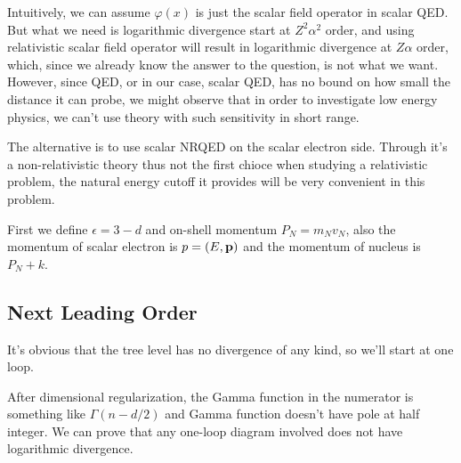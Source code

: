 \documentclass[aps,prd,preprint,showkeys,10pt]{revtex4-1}
\newcommand{\vbp}{\vb{p}}
\renewcommand{\a}{\alpha}
\begin{document}
Intuitively, we can assume $\varphi(x)$ is just the scalar field operator in scalar QED. But what we need is logarithmic divergence start at $Z^2\a^2$ order, and using relativistic scalar field operator will result in logarithmic divergence at $Z\a$ order, which, since we already know the answer to the question, is not what we want. However, since QED, or in our case, scalar QED, has no bound on how small the distance it can probe, we might observe that in order to investigate low energy physics, we can't use theory with such sensitivity in short range.

The alternative is to use scalar NRQED on the scalar electron side. Through it's a non-relativistic theory thus not the first chioce when studying a relativistic problem, the natural energy cutoff it provides will be very convenient in this problem.

First we define $\epsilon=3-d$ and on-shell momentum $P_N=m_Nv_N$, also the momentum of scalar electron is $p=(E,\vbp)$ and the momentum of nucleus is $P_N+k$.
\subsection{Next Leading Order}
It's obvious that the tree level has no divergence of any kind, so we'll start at one loop.

After dimensional regularization, the Gamma function in the numerator is something like $\Gamma(n-d/2)$ and Gamma function doesn't have pole at half integer. We can prove that any one-loop diagram involved does not have logarithmic divergence.

\end{document}

